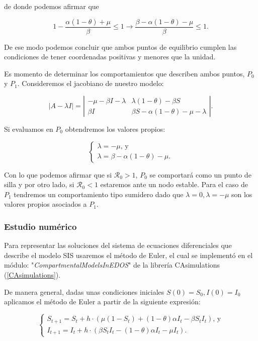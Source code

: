 de donde podemos afirmar que 

$$1-\frac{\alpha(1-\theta)+\mu}{\beta}\leq1 \longrightarrow \frac{\beta-\alpha(1-\theta)-\mu}{\beta}\leq1.$$

De ese modo podemos concluir que ambos puntos de equilibrio cumplen las condiciones de tener coordenadas positivas y menores que la unidad.

Es momento de determinar los comportamientos que describen ambos puntos, $P_0$ y $P_1$. Consideremos el jacobiano de nuestro modelo:

$$|A-\lambda I|=
\left|\begin{array}{cc}
-\mu-\beta I-\lambda & \lambda(1-\theta)-\beta S \\
\beta I & \beta S-\alpha(1-\theta)-\mu-\lambda
\end{array}\right|.$$

Si evaluamos en $P_0$ obtendremos los valores propios:

$$\left\{\begin{array}{l}\lambda=-\mu\text{, y}\\
\lambda=\beta-\alpha(1-\theta)-\mu.\end{array}\right.$$

Con lo que podemos afirmar que si $\mathcal{R}_0>1$, $P_0$ se comportará como un punto de silla y por otro lado, si $\mathcal{R}_0<1$ estaremos ante un nodo estable. Para el caso de $P_1$ tendremos un comportamiento tipo sumidero dado que $\lambda=0,\lambda=-\mu$ son los valores propios asociados a $P_1$.

\subsubsection{Estudio numérico}

Para representar las soluciones del sistema de ecuaciones diferenciales que describe el modelo SIS usaremos el método de Euler, el cual se implementó en el módulo: "\textit{CompartmentalModelsInEDOS}" de la librería CAsimulations (\ref{CAsimulations}).

De manera general, dadas unas condiciones iniciales $S(0)=S_0,I(0)=I_0$ aplicamos el método de Euler a partir de la siguiente expresión:

$$\left\{\begin{array}{l}
S_{t+1} = S_t + h\cdot(\mu(1 - S_t) + (1 - \theta)\alpha I_t - \beta S_t I_t )\text{, y} \\
I_{t+1} = I_t + h\cdot(\beta S_t I_t - (1 - \theta)\alpha I_t - \mu I_t).
\end{array}\right.$$

